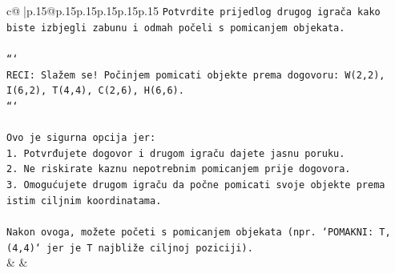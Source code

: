 \documentclass{article}
\begin{document}
{\begin{supertabular}{c@{$\;$}|p{.15\linewidth}@{}p{.15\linewidth}p{.15\linewidth}p{.15\linewidth}p{.15\linewidth}p{.15\linewidth}}
{{{\texttt{Potvrdite prijedlog drugog igrača kako biste izbjegli zabunu i odmah počeli s pomicanjem objekata.} \\
\\ 
\texttt{```} \\
\texttt{RECI: Slažem se! Počinjem pomicati objekte prema dogovoru: W(2,2), I(6,2), T(4,4), C(2,6), H(6,6).} \\
\texttt{```} \\
\\ 
\texttt{Ovo je sigurna opcija jer:} \\
\texttt{1. Potvrđujete dogovor i drugom igraču dajete jasnu poruku.} \\
\texttt{2. Ne riskirate kaznu nepotrebnim pomicanjem prije dogovora.} \\
\texttt{3. Omogućujete drugom igraču da počne pomicati svoje objekte prema istim ciljnim koordinatama.} \\
\\ 
\texttt{Nakon ovoga, možete početi s pomicanjem objekata (npr. `POMAKNI: T, (4,4)` jer je T najbliže ciljnoj poziciji).} \\
            }
        }
    }
    & & \\ \\


\end{supertabular}}
\end{document}
